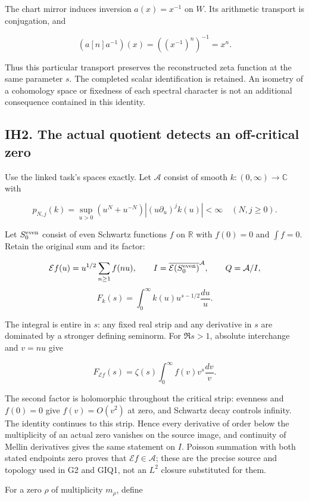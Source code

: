 The chart mirror induces inversion \(a(x)=x^{-1}\) on \(W\). Its
arithmetic transport is conjugation, and

\[
(a[n]a^{-1})(x)=((x^{-1})^n)^{-1}=x^n.
\tag{IH1.5}
\]

Thus this particular transport preserves the reconstructed zeta function
at the same parameter \(s\). The completed scalar identification is
retained. An isometry of a cohomology space or fixedness of each
spectral character is not an additional consequence contained in this
identity.

\subsection{IH2. The actual quotient detects an off-critical
zero}\label{ih2.-the-actual-quotient-detects-an-off-critical-zero}

Use the linked task's spaces exactly. Let \(\mathcal A\) consist of
smooth \(k:(0,\infty)\to\mathbb C\) with

\[
p_{N,j}(k)=\sup_{u>0}(u^N+u^{-N})|(u\partial_u)^j k(u)|<\infty
\quad(N,j\ge0).
\]

Let \(S_0^{\rm even}\) consist of even Schwartz functions \(f\) on
\(\mathbb R\) with \(f(0)=0\) and \(\int f=0\). Retain the original sum
and its factor:

\[
\mathcal E f(u)=u^{1/2}\sum_{n\ge1}f(nu),\qquad
I=\overline{\mathcal E(S_0^{\rm even})}^{\mathcal A},\qquad Q=\mathcal A/I,
\] \[
F_k(s)=\int_0^\infty k(u)u^{s-1/2}\frac{du}{u}.
\tag{IH2.1}
\]

The integral is entire in \(s\): any fixed real strip and any derivative
in \(s\) are dominated by a stronger defining seminorm. For \(\Re s>1\),
absolute interchange and \(v=nu\) give

\[
F_{\mathcal E f}(s)=\zeta(s)\int_0^\infty f(v)v^s\frac{dv}{v}.
\tag{IH2.2}
\]

The second factor is holomorphic throughout the critical strip: evenness
and \(f(0)=0\) give \(f(v)=O(v^2)\) at zero, and Schwartz decay controls
infinity. The identity continues to this strip. Hence every derivative
of order below the multiplicity of an actual zero vanishes on the source
image, and continuity of Mellin derivatives gives the same statement on
\(I\). Poisson summation with both stated endpoints zero proves that
\(\mathcal E f\in\mathcal A\); these are the precise source and topology
used in G2 and GIQ1, not an \(L^2\) closure substituted for them.

For a zero \(\rho\) of multiplicity \(m_\rho\), define

